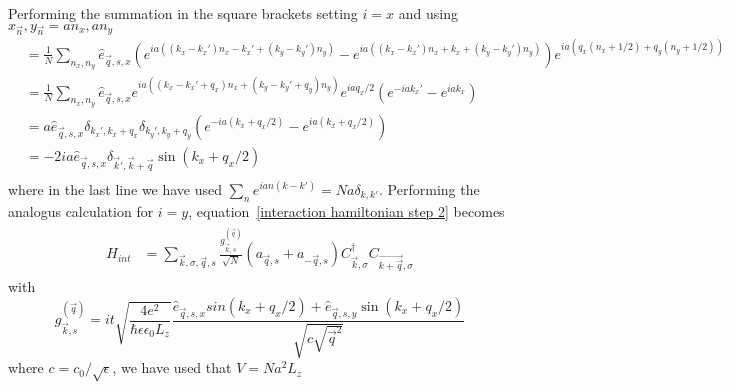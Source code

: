 \documentclass{article}
\begin{document}
Performing the summation in the square brackets setting $i = x$ and using $x_{\vec{n}},y_{\vec{n}} = a n_x, a n_y$
\begin{align}
    [...] &= \frac{1}{N}\sum_{n_x, n_y} \hat{e}_{\vec{q},s,x} ( e^{i a\left((k_x - k_x') n_x - k_x' + (k_y - k_y') n_y \right)} -  e^{i a\left((k_x - k_x') n_x + k_x + (k_y - k_y') n_y \right)}) e^{i a \left(q_x \left(n_x + 1/2\right) + q_y (n_y + 1/2)\right)}\\
          &= \frac{1}{N}\sum_{n_x, n_y} \hat{e}_{\vec{q},s,x} e^{i a\left((k_x - k_x' + q_x) n_x + (k_y - k_y' + q_y) n_y \right)} e^{ia q_x / 2} ( e^{- i a k_x' } -  e^{i a k_x })\\
          &= a \hat{e}_{\vec{q},s,x} \delta_{k_x',k_x + q_x} \delta_{k_y',k_y + q_y}  ( e^{- i a (k_x + q_x /2) } -  e^{i a (k_x + q_x/2)  })\\
          &=   -2 i a \hat{e}_{\vec{q},s,x} \delta_{\vec{k}',\vec{k} + \vec{q}} \sin(k_x + q_x /2)\\
\end{align}
where in the last line we have used $\sum_n e^{ian(k - k')} = N a \delta_{k,k'}$. Performing the analogus calculation for $i = y$, equation~\ref{interaction hamiltonian step 2} becomes
\begin{align}
\begin{split}
    H_{int} &=  \sum_{\vec{k},\sigma,\vec{q},s} \frac{g_{\vec{k},s}^{(\vec{q})}}{\sqrt{N}} \left(a_{\vec{q},s} + a_{-\vec{q}, s}\right) C_{\vec{k},\sigma}^{\dagger} C_{\vec{k + \vec{q}},\sigma} 
    \end{split}
\end{align}
with 
\begin{equation}
   g_{\vec{k},s}^{(\vec{q})} = i t \sqrt{\frac{4 e^2}{\hbar \epsilon \epsilon_0 L_z}} \frac{\hat{e}_{\vec{q},s,x} sin(k_x + q_x /2) + \hat{e}_{\vec{q},s,y} \sin(k_x + q_x /2)}{\sqrt{c \sqrt{\vec{q}^2}}}
\end{equation}
where $c = c_0 / \sqrt{\epsilon}$, we have used that $V = N a^2 L_z$

\printbibliography
\end{document}
